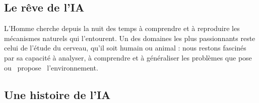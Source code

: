\subsection{Le rêve de l'IA}
L'Homme cherche depuis la nuit des temps à comprendre et à reproduire les
mécanismes naturels qui l'entourent. Un des domaines les plus passionnants
reste celui de l'étude du cerveau, qu'il soit humain ou animal : nous restons
fascinés par sa capacité à analyser, à comprendre et à généraliser les problèmes
que pose ou \og{}~propose~\fg{} l'environnement.
\subsection{Une histoire de l'IA}